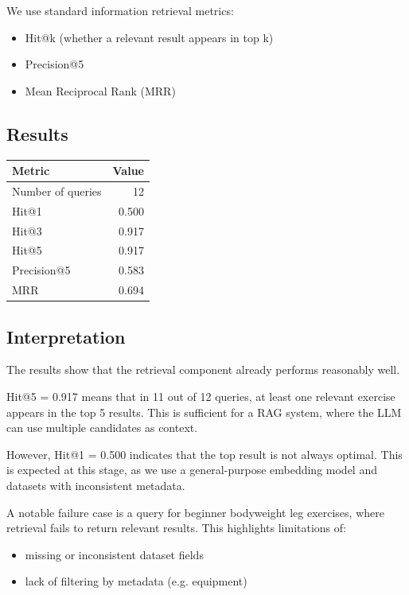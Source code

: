 \documentclass[fleqn,moreauthors,10pt]{ds_report}
\begin{document}
We use standard information retrieval metrics:

\begin{itemize}
\item Hit@k (whether a relevant result appears in top k)
\item Precision@5
\item Mean Reciprocal Rank (MRR)
\end{itemize}

\subsection*{Results}

\begin{center}
\begin{tabular}{l r}
\hline
Metric & Value \\
\hline
Number of queries & 12 \\
Hit@1 & 0.500 \\
Hit@3 & 0.917 \\
Hit@5 & 0.917 \\
Precision@5 & 0.583 \\
MRR & 0.694 \\
\hline
\end{tabular}
\end{center}

\subsection*{Interpretation}

The results show that the retrieval component already performs reasonably well.

Hit@5 = 0.917 means that in 11 out of 12 queries, at least one relevant exercise appears in the top 5 results. This is sufficient for a RAG system, where the LLM can use multiple candidates as context.

However, Hit@1 = 0.500 indicates that the top result is not always optimal. This is expected at this stage, as we use a general-purpose embedding model and datasets with inconsistent metadata.

A notable failure case is a query for beginner bodyweight leg exercises, where retrieval fails to return relevant results. This highlights limitations of:

\begin{itemize}
\item missing or inconsistent dataset fields
\item lack of filtering by metadata (e.g. equipment)
\end{itemize}
\end{document}
